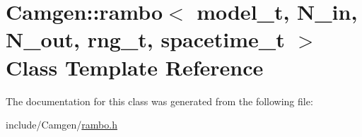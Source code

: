 \hypertarget{a00457}{\section{Camgen\-:\-:rambo$<$ model\-\_\-t, N\-\_\-in, N\-\_\-out, rng\-\_\-t, spacetime\-\_\-t $>$ Class Template Reference}
\label{a00457}
}


The documentation for this class was generated from the following file\-:\begin{DoxyCompactItemize}
\item 
include/\-Camgen/\hyperlink{a00728}{rambo.\-h}\end{DoxyCompactItemize}
